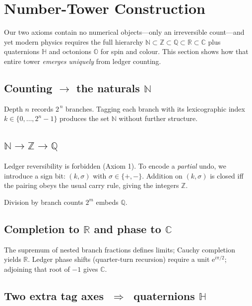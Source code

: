\section{Number-Tower Construction}
\label{sec:number}

Our two axioms contain no numerical objects—only an irreversible
count—and yet modern physics requires the full hierarchy
$\mathbb N\subset\mathbb Z\subset\mathbb Q\subset\mathbb R\subset\mathbb C$
plus quaternions $\mathbb H$ and octonions $\mathbb O$ for spin and colour.
This section shows how that entire tower \emph{emerges uniquely} from
ledger counting.

\subsection{Counting $\longrightarrow$ the naturals $\mathbb N$}

Depth $n$ records $2^{\,n}$ branches.  Tagging each branch with its
lexicographic index $k\in\{0,\dots,2^{n}\!-\!1\}$ produces the set
$\mathbb N$ without further structure.

\subsection{$\mathbb N\longrightarrow\mathbb Z\longrightarrow\mathbb Q$}

Ledger reversibility is forbidden (Axiom 1).  
To encode a \emph{partial} undo, we introduce a sign bit:
$(k,\sigma)$ with $\sigma\!\in\!\{+,-\}$.
Addition on $(k,\sigma)$ is closed iff the
pairing obeys the usual carry rule, giving the integers $\mathbb Z$.

Division by branch counts $2^{m}$ embeds $\mathbb Q$.

\subsection{Completion to $\mathbb R$ and phase to $\mathbb C$}

The supremum of nested branch fractions defines limits;  
Cauchy completion yields $\mathbb R$.
Ledger phase shifts (quarter-turn recursion) require a unit
$\mathrm e^{i\pi/2}$; adjoining that root of $-1$ gives $\mathbb C$.

\subsection{Two extra tag axes $\;\Rightarrow\;$ quaternions $\mathbb H$}

